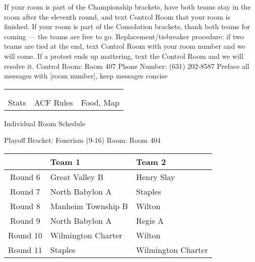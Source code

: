 \documentclass{article}%
\begin{document}
\vspace*{16pt}%
\linebreak%
If your room is part of the Championship brackets, have both teams stay in the room after the eleventh round, and text Control Room that your room is finished.\newline%
\newline%
If your room is part of the Consolation brackets, thank both teams for coming — the teams are free to go.\newline%
\newline%
Replacement/tiebreaker procedure: if two teams are tied at the end, text Control Room with your room number and we will come. If a protest ends up mattering, text the Control Room and we will resolve it.\newline%
\newline%
Control Room: Room 407\newline%
Phone Number: (631) 202{-}8587\newline%
Preface all messages with {[}room number{]}, keep messages concise%
\vspace*{30pt}%
\newline%
%
\begin{tabularx}{\textwidth}{YYY}%
  &  &  \\%
\\%
Stats&ACF Rules&Food, Map\\%
\end{tabularx}%
\newpage%
\begin{center}%
\begin{Huge}%
Individual Room Schedule%
\end{Huge}%
\vspace*{16pt}%
\linebreak%
\begin{Large}%
Playoff Bracket: Fonerism (9-16) \hfill Room: Room 404%
\end{Large}%
\end{center}%
%
\begin{tabularx}{\textwidth}{|c|Y|Y|}%
\hline%
&Team 1&Team 2\\%
\hline%
Round 6&Great Valley B&Henry Slay\\%
Round 7&North Babylon A&Staples\\%
Round 8&Manheim Township B&Wilton\\%
Round 9&North Babylon A&Regis A\\%
Round 10&Wilmington Charter&Wilton\\%
Round 11&Staples&Wilmington Charter\\%
\hline%
\end{tabularx}%
\end{document}
